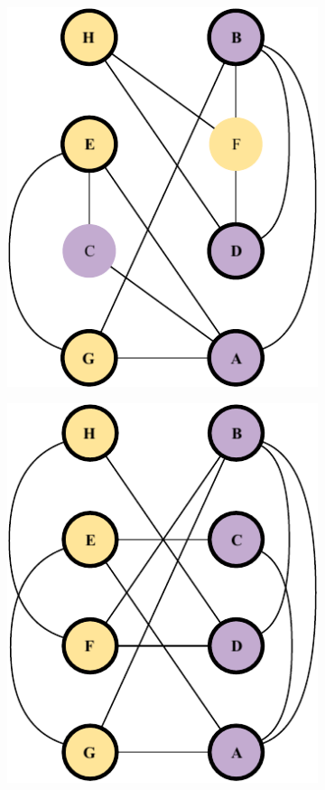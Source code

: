 \documentclass[a4paper, 10pt]{article}
\begin{document}
\begin{figure}[H]
\begin{subfigure}{0.19\textwidth}
        \includegraphics[width=1\linewidth]{5_14.pdf}
    \end{subfigure}
    \hfill
    \begin{subfigure}{0.19\textwidth}
        \centering
        \includegraphics[width=1\linewidth]{5_15.pdf}

\end{subfigure}
\end{figure}
\end{document}
